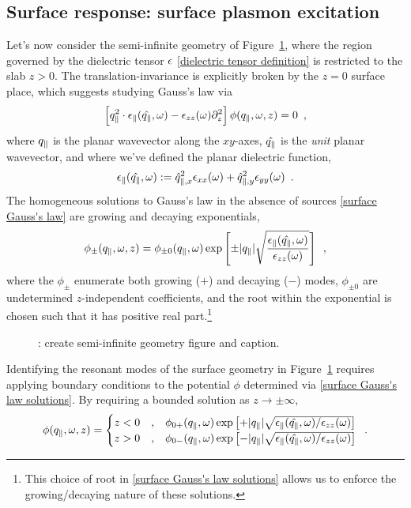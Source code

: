 \subsection{Surface response: surface plasmon excitation}

Let's now consider the semi-infinite geometry of Figure~\ref{figure: semi-infinite geometry}, where the region governed by the dielectric tensor $\epsilon$ \eqref{dielectric tensor definition} is restricted to the slab $z>0$.  The translation-invariance is explicitly broken by the $z=0$ surface place, which suggests studying Gauss's law via
\begin{equation}
    \label{surface Gauss's law}
    \left[q_{\parallel}^2\cdot\epsilon_{\parallel}(\hat {q_{\parallel}},\omega) - \epsilon_{zz}(\omega)\partial_z^2\right]\phi(q_{\parallel},\omega, z) = 0
    \,\,\,,
\end{equation}
where $q_{\parallel}$ is the planar wavevector along the $xy$-axes, $\hat{q_{\parallel}}$ is the {\it unit} planar wavevector, and where we've defined the planar dielectric function,
\begin{equation}
    \epsilon_{\parallel}(\hat {q_{\parallel}},\omega) := \hat q_{\parallel, x}^2 \epsilon_{xx}(\omega) + \hat q_{\parallel,y}^2 \epsilon_{yy}(\omega)
    \,\,\,.
\end{equation}
The homogeneous solutions to Gauss's law in the absence of sources \eqref{surface Gauss's law} are growing and decaying exponentials,
\begin{equation}
    \label{surface Gauss's law solutions}
    \phi_{\pm}(q_{\parallel},\omega, z) = 
    \phi_{\pm0}(q_{\parallel},\omega) \exp\left[ \pm|q_{\parallel}|\sqrt{\frac{\epsilon_{\parallel}(\hat{q_{\parallel}},\omega)}{\epsilon_{zz}(\omega)}} \right]
    \,\,\,,
\end{equation}
where the $\phi_{\pm}$ enumerate both growing ($+$) and decaying ($-$) modes, $\phi_{\pm0}$ are undetermined $z$-independent coefficients, and the root within the exponential is chosen such that it has positive real part.\footnote{This choice of root in \eqref{surface Gauss's law solutions} allows us to enforce the growing/decaying nature of these solutions.}

\begin{figure}
    \centering
    \caption{
        : create semi-infinite geometry figure and caption.
    }
    \label{figure: semi-infinite geometry}
\end{figure}

Identifying the resonant modes of the surface geometry in Figure~\ref{figure: semi-infinite geometry} requires applying boundary conditions to the potential $\phi$ determined via \eqref{surface Gauss's law solutions}.  By requiring a bounded solution as $z\to\pm\infty$,
\begin{equation}
    \label{undetermined surface potential}
    \phi(q_{\parallel},\omega,z) = 
    \begin{cases}
        z < 0\quad, & 
        \phi_{0+}(q_{\parallel},\omega) \exp\left[+|q_{\parallel}|\sqrt{\epsilon_{\parallel}(\hat{q_{\parallel}},\omega)/\epsilon_{zz}(\omega)}\right]
        \\
        z > 0\quad, & 
        \phi_{0-}(q_{\parallel},\omega) \exp\left[-|q_{\parallel}|\sqrt{\epsilon_{\parallel}(\hat{q_{\parallel}},\omega)/\epsilon_{zz}(\omega)}\right]
    \end{cases}
    \,\,\,.
\end{equation}